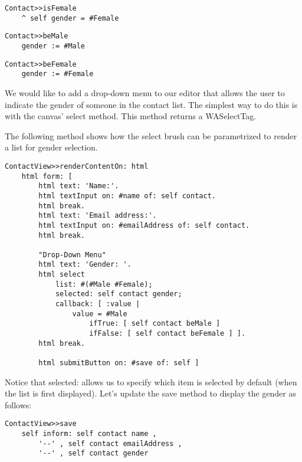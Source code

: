 \documentclass[a4paper,10pt,twoside]{book}
\newcommand{\ct}[1]{{\small\ttfamily\textup{#1}}}
\begin{document}
\begin{lstlisting}
Contact>>isFemale
    ^ self gender = #Female
\end{lstlisting}

\begin{lstlisting}
Contact>>beMale
    gender := #Male
\end{lstlisting}

\begin{lstlisting}
Contact>>beFemale
    gender := #Female
\end{lstlisting}

We would like to add a drop-down menu to our editor that allows the user to indicate the gender of someone in the contact list. The simplest way to do this is with the canvas' \ct{select} method. This method returns a  \ct{WASelectTag}.

The following method shows how the \ct{select} brush can be parametrized to render a list for gender selection.

\begin{lstlisting}
ContactView>>renderContentOn: html
    html form: [
        html text: 'Name:'.
        html textInput on: #name of: self contact.
        html break.
        html text: 'Email address:'.
        html textInput on: #emailAddress of: self contact.
        html break.

        "Drop-Down Menu"
        html text: 'Gender: '.
        html select 
            list: #(#Male #Female);
            selected: self contact gender;
            callback: [ :value |
                value = #Male
                    ifTrue: [ self contact beMale ]
                    ifFalse: [ self contact beFemale ] ].
        html break.

        html submitButton on: #save of: self ]
\end{lstlisting}

Notice that \ct{selected:} allows us to specify which item is selected by default (when the list is first displayed). Let's update the \ct{save} method to display the gender as follows:

\begin{lstlisting}
ContactView>>save  
    self inform: self contact name , 
        '--' , self contact emailAddress , 
        '--' , self contact gender
\end{lstlisting}
\end{document}
